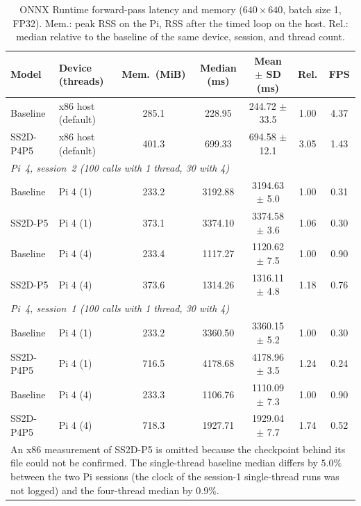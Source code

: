 \begin{table}[!t]
\caption{ONNX Runtime forward-pass latency and memory ($640 \times 640$, batch size 1, FP32). Mem.: peak RSS on the Pi, RSS after the timed loop on the host. Rel.: median relative to the baseline of the same device, session, and thread count.}
\label{tab:edge_runtime}
\centering
\footnotesize
\setlength{\tabcolsep}{3pt}
\begin{tabular}{llccccc}
\toprule
\textbf{Model} & \textbf{Device (threads)} & \textbf{Mem.\ (MiB)} & \textbf{Median (ms)} & \textbf{Mean $\pm$ SD (ms)} & \textbf{Rel.} & \textbf{FPS} \\
\midrule
Baseline & x86 host (default) & 285.1 & 228.95 & 244.72 $\pm$ 33.5 & 1.00 & 4.37 \\
SS2D-P4P5 & x86 host (default) & 401.3 & 699.33 & 694.58 $\pm$ 12.1 & 3.05 & 1.43 \\
\midrule
\multicolumn{7}{l}{\textit{Pi~4, session~2 (100 calls with 1 thread, 30 with 4)}} \\
Baseline & Pi 4 (1) & 233.2 & 3192.88 & 3194.63 $\pm$ 5.0 & 1.00 & 0.31 \\
SS2D-P5 & Pi 4 (1) & 373.1 & 3374.10 & 3374.58 $\pm$ 3.6 & 1.06 & 0.30 \\
Baseline & Pi 4 (4) & 233.4 & 1117.27 & 1120.62 $\pm$ 7.5 & 1.00 & 0.90 \\
SS2D-P5 & Pi 4 (4) & 373.6 & 1314.26 & 1316.11 $\pm$ 4.8 & 1.18 & 0.76 \\
\midrule
\multicolumn{7}{l}{\textit{Pi~4, session~1 (100 calls with 1 thread, 30 with 4)}} \\
Baseline & Pi 4 (1) & 233.2 & 3360.50 & 3360.15 $\pm$ 5.2 & 1.00 & 0.30 \\
SS2D-P4P5 & Pi 4 (1) & 716.5 & 4178.68 & 4178.96 $\pm$ 3.5 & 1.24 & 0.24 \\
Baseline & Pi 4 (4) & 233.3 & 1106.76 & 1110.09 $\pm$ 7.3 & 1.00 & 0.90 \\
SS2D-P4P5 & Pi 4 (4) & 718.3 & 1927.71 & 1929.04 $\pm$ 7.7 & 1.74 & 0.52 \\
\bottomrule
\multicolumn{7}{p{0.95\textwidth}}{\scriptsize An x86 measurement of SS2D-P5 is omitted because the checkpoint behind its file could not be confirmed. The single-thread baseline median differs by $5.0\%$ between the two Pi sessions (the clock of the session-1 single-thread runs was not logged) and the four-thread median by $0.9\%$.} \\
\end{tabular}
\end{table}

